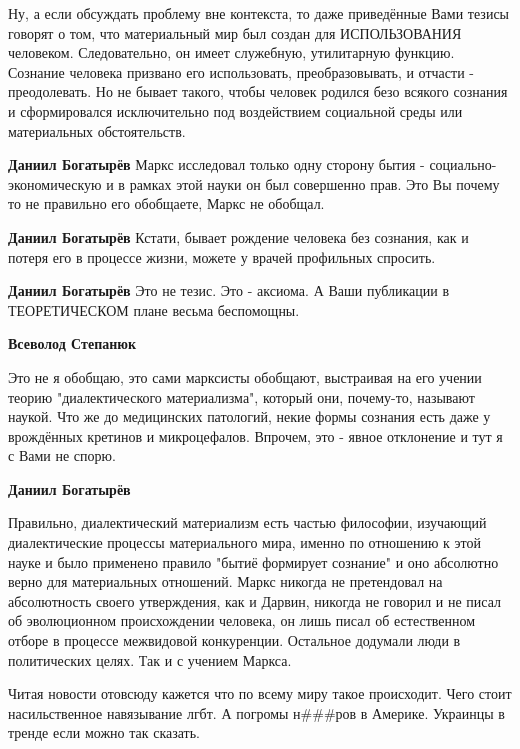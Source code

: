 \begin{itemize}
\begin{itemize}
Ну, а если обсуждать проблему вне контекста, то даже приведённые Вами тезисы
говорят о том, что материальный мир был создан для ИСПОЛЬЗОВАНИЯ человеком.
Следовательно, он имеет служебную, утилитарную функцию. Сознание человека
призвано его использовать, преобразовывать, и отчасти - преодолевать. Но не
бывает такого, чтобы человек родился безо всякого сознания и сформировался
исключительно под воздействием социальной среды или материальных обстоятельств.


\textbf{Даниил Богатырёв} Маркс исследовал только одну сторону бытия - социально-экономическую и в рамках этой науки он был совершенно прав. Это Вы почему то не правильно его обобщаете, Маркс не обобщал.

\textbf{Даниил Богатырёв} Кстати, бывает рождение человека без сознания, как и потеря его в процессе жизни, можете у врачей профильных спросить.

\textbf{Даниил Богатырёв} Это не тезис. Это - аксиома. А Ваши публикации в ТЕОРЕТИЧЕСКОМ плане весьма беспомощны.

\textbf{Всеволод Степанюк} 

Это не я обобщаю, это сами марксисты обобщают, выстраивая на его учении теорию
"диалектического материализма", который они, почему-то, называют наукой. Что же
до медицинских патологий, некие формы сознания есть даже у врождённых кретинов
и микроцефалов. Впрочем, это - явное отклонение и тут я с Вами не спорю.

\textbf{Даниил Богатырёв} 

Правильно, диалектический материализм есть частью философии, изучающий
диалектические процессы материального мира, именно по отношению к этой науке и
было применено правило "бытиё формирует сознание" и оно абсолютно верно для
материальных отношений. Маркс никогда не претендовал на абсолютность своего
утверждения, как и Дарвин, никогда не говорил и не писал об эволюционном
происхождении человека, он лишь писал об естественном отборе в процессе
межвидовой конкуренции. Остальное додумали люди в политических целях. Так и с
учением Маркса.

\end{itemize} %


Читая новости отовсюду кажется что по всему миру такое происходит. Чего стоит
насильственное навязывание лгбт. А погромы н###ров в Америке. Украинцы в тренде
если можно так сказать.


\end{itemize}
